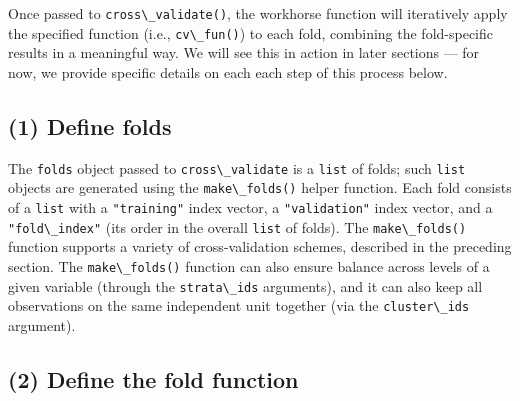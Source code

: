 \documentclass[
  12pt, krantz2,
]{krantz}
\newcommand{\passthrough}[1]{#1}
\newcommand{\1}{\mathbbm{1}}
\theoremstyle{definition}
\theoremstyle{definition}
\theoremstyle{definition}
\theoremstyle{definition}
\theoremstyle{remark}
\begin{document}
Once passed to \passthrough{\lstinline!cross\_validate()!}, the workhorse function will iteratively apply
the specified function (i.e., \passthrough{\lstinline!cv\_fun()!}) to each fold, combining the
fold-specific results in a meaningful way. We will see this in action in later
sections --- for now, we provide specific details on each each step of this
process below.

\hypertarget{define-folds}{%
\subsection{(1) Define folds}\label{define-folds}}

The \passthrough{\lstinline!folds!} object passed to \passthrough{\lstinline!cross\_validate!} is a \passthrough{\lstinline!list!} of folds; such \passthrough{\lstinline!list!}
objects are generated using the \passthrough{\lstinline!make\_folds()!} helper function. Each fold
consists of a \passthrough{\lstinline!list!} with a \passthrough{\lstinline!"training"!} index vector, a \passthrough{\lstinline!"validation"!} index
vector, and a \passthrough{\lstinline!"fold\_index"!} (its order in the overall \passthrough{\lstinline!list!} of folds). The
\passthrough{\lstinline!make\_folds()!} function supports a variety of cross-validation schemes,
described in the preceding section. The \passthrough{\lstinline!make\_folds()!} function can also ensure
balance across levels of a given variable (through the \passthrough{\lstinline!strata\_ids!} arguments),
and it can also keep all observations on the same independent unit together (via
the \passthrough{\lstinline!cluster\_ids!} argument).

\hypertarget{define-the-fold-function}{%
\subsection{(2) Define the fold function}\label{define-the-fold-function}}
\end{document}
